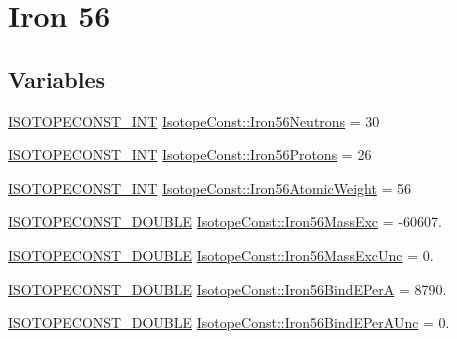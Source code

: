 \hypertarget{group___isotope_const-_iron-_fe56}{}\section{Iron 56}
\label{group___isotope_const-_iron-_fe56}
\subsection*{Variables}
\begin{DoxyCompactItemize}
\item 
\mbox{\hyperlink{group___isotope_const-_macros_ga5f18360b3e99483a35c32d789e62621c}{I\+S\+O\+T\+O\+P\+E\+C\+O\+N\+S\+T\+\_\+\+I\+NT}} \mbox{\hyperlink{group___isotope_const-_iron-_fe56_gabb37ea2029455598c31afac20697791c}{Isotope\+Const\+::\+Iron56\+Neutrons}} = 30
\item 
\mbox{\hyperlink{group___isotope_const-_macros_ga5f18360b3e99483a35c32d789e62621c}{I\+S\+O\+T\+O\+P\+E\+C\+O\+N\+S\+T\+\_\+\+I\+NT}} \mbox{\hyperlink{group___isotope_const-_iron-_fe56_ga3a57df0b5eef0cfbcc63ac46b482f0da}{Isotope\+Const\+::\+Iron56\+Protons}} = 26
\item 
\mbox{\hyperlink{group___isotope_const-_macros_ga5f18360b3e99483a35c32d789e62621c}{I\+S\+O\+T\+O\+P\+E\+C\+O\+N\+S\+T\+\_\+\+I\+NT}} \mbox{\hyperlink{group___isotope_const-_iron-_fe56_ga32c0811c6d327f3f265fd0c21d3681b8}{Isotope\+Const\+::\+Iron56\+Atomic\+Weight}} = 56
\item 
\mbox{\hyperlink{group___isotope_const-_macros_ga8f45a7272ce02c0b4c65c44636ed719a}{I\+S\+O\+T\+O\+P\+E\+C\+O\+N\+S\+T\+\_\+\+D\+O\+U\+B\+LE}} \mbox{\hyperlink{group___isotope_const-_iron-_fe56_ga814e172cea9ef71be91485ae65c0a0da}{Isotope\+Const\+::\+Iron56\+Mass\+Exc}} = -\/60607.
\item 
\mbox{\hyperlink{group___isotope_const-_macros_ga8f45a7272ce02c0b4c65c44636ed719a}{I\+S\+O\+T\+O\+P\+E\+C\+O\+N\+S\+T\+\_\+\+D\+O\+U\+B\+LE}} \mbox{\hyperlink{group___isotope_const-_iron-_fe56_gae25114f5b7f62317c5a43e6d83c7cfc5}{Isotope\+Const\+::\+Iron56\+Mass\+Exc\+Unc}} = 0.
\item 
\mbox{\hyperlink{group___isotope_const-_macros_ga8f45a7272ce02c0b4c65c44636ed719a}{I\+S\+O\+T\+O\+P\+E\+C\+O\+N\+S\+T\+\_\+\+D\+O\+U\+B\+LE}} \mbox{\hyperlink{group___isotope_const-_iron-_fe56_ga36c5782affff5abf06fae16914558db2}{Isotope\+Const\+::\+Iron56\+Bind\+E\+PerA}} = 8790.
\item 
\mbox{\hyperlink{group___isotope_const-_macros_ga8f45a7272ce02c0b4c65c44636ed719a}{I\+S\+O\+T\+O\+P\+E\+C\+O\+N\+S\+T\+\_\+\+D\+O\+U\+B\+LE}} \mbox{\hyperlink{group___isotope_const-_iron-_fe56_gaa6de764bfa73cad3238dec0585b3eba9}{Isotope\+Const\+::\+Iron56\+Bind\+E\+Per\+A\+Unc}} = 0.

\end{DoxyCompactItemize}
